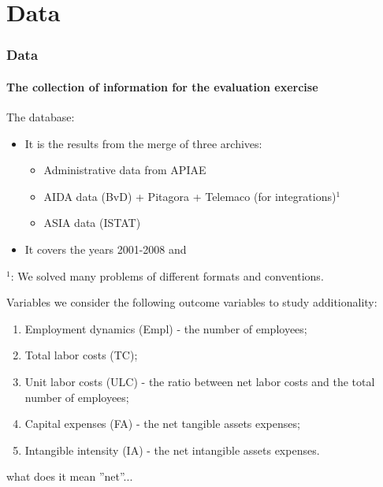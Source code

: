 \documentclass[10pt,handout,xcolor=pdftex,dvipsnames,table]{beamer}
\begin{document}
\section{Data}
\begin{frame}
\frametitle{Data}
\framesubtitle{The collection of information for the evaluation exercise}

\begin{block} {The database:} 
\begin{itemize}

\item It is the results from the merge of three archives:
		\begin{itemize}
		\item Administrative data from APIAE
		\item AIDA data (BvD) + Pitagora + Telemaco (for integrations)$^1$
		\item ASIA data (ISTAT)
		\end{itemize}
\item It covers the years 2001-2008 and 
\end{itemize}
\end{block}


{\footnotesize $^1$: We solved many problems of different formats and conventions.}
\end{frame}
\begin{frame}{Variables}
we consider the following outcome variables to study additionality:
\begin{enumerate}
\item Employment dynamics (Empl) - the number of employees;
\item  Total labor costs (TC);
\item  Unit labor costs (ULC) - the ratio between net labor costs and the total number of employees; 
\item  Capital expenses (FA) - the net tangible assets expenses;
\item  Intangible intensity (IA) - the net intangible assets expenses.
\end{enumerate}
what does it mean ''net''...
\end{frame}
\end{document}
